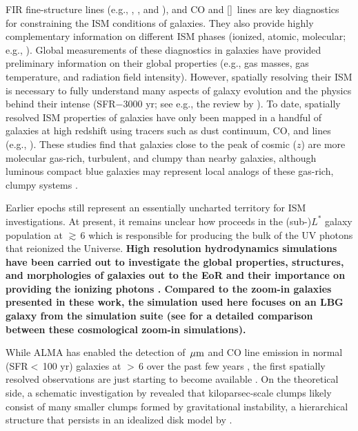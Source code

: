 \IfFileExists{emulateapjlegacy.cls}{\documentclass[iop]{emulateapjlegacy}}{\documentclass[iop]{emulateapj}}
\begin{document}
FIR fine-structure lines (e.g., \cii, \nii, and \oiii), and CO and [\ci]~lines are key diagnostics for constraining the ISM conditions of galaxies. They also provide highly complementary information on different ISM phases (ionized, atomic, molecular; e.g., \citealt{Scoville74a, Rubin85a, Malhotra01a}).
%
Global measurements of these diagnostics in \highz galaxies have provided preliminary information on their global properties (e.g., gas masses, gas temperature, and radiation field intensity). However, spatially resolving their ISM is necessary to fully understand many aspects of galaxy evolution and the physics behind their intense \SF (SFR$-$3000\,\Msun\,yr\pmOne; see e.g., the review by \citealt{CW13}).
%
To date, spatially resolved ISM properties of \highz galaxies have only been mapped in a handful of galaxies at high redshift using tracers such as dust continuum, CO, and \cii lines (e.g., \citealt{Swinbank11a, Hodge15a, Ferkinhoff15a, Hodge16a, Leung19a}). These studies find that galaxies close to the peak of cosmic \SF ($z$) are more molecular gas-rich, turbulent, and clumpy than nearby galaxies, although luminous compact blue galaxies may represent local analogs of these gas-rich, clumpy systems \citep{Garland15}.

Earlier epochs still represent an essentially uncharted territory for ISM investigations. At present, it remains unclear how \SF proceeds in the (sub-)$L^*$ galaxy population at \z$\gtrsim$\,6  which is responsible for producing the bulk of the UV photons that reionized the Universe.
{\bf High resolution hydrodynamics simulations have been carried out to investigate the global properties, structures,
and morphologies of galaxies out to the EoR and their importance on providing
the ionizing photons \citep[see e.g.,][]{Ceverino17a, Katz17a, Ma18a, Trebitsch18a, Rosdahl18a}.
Compared to the zoom-in galaxies presented in these work,
the simulation used here focuses on an LBG galaxy \citep{Pallottini17a} from the  simulation suite
(see \citealt{Pallottini19a} for a detailed comparison between these cosmological zoom-in simulations).
}

%
While ALMA has enabled the detection of \,$\mbox{$\mu$m}$ and CO line emission in normal (SFR$<$\,100\,\Msun\,yr\pmOne) galaxies at \z$>$\,6 over the past few years \citep[e.g.,][]{Carniani18b, Odorico18a}, the first spatially resolved observations are just starting to become available \citep[e.g., ][]{Jones17a}.
%
On the theoretical side, a schematic investigation by \citet{Behrendt16} revealed that kiloparsec-scale clumps likely consist of many smaller clumps formed by gravitational instability, a hierarchical structure that persists in an idealized disk model by \citet{Behrendt19}.
\end{document}
